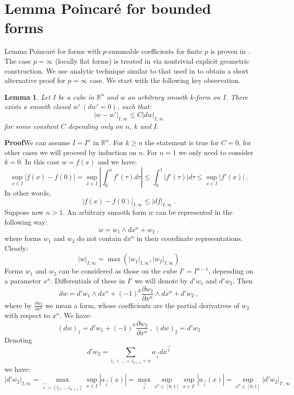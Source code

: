\documentclass{amsart}%
\newtheorem{lem}[thm]{Lemma}
\begin{document}
\section{Lemma Poincar\'e for bounded forms}
Lemma Poincar\'e for forms with $p$-summable coefficients for
finite $p$ is proven in \cite[Lemma 3.4]{GKS}. The case $p=\infty$
(locally flat forms) is treated in \cite{W} via nontrivial
explicit geometric construction. We use analytic technique similar
to that used in \cite{GKS} to obtain a short alternative proof for
$p=\infty$ case. We start with the following key observation.
\begin{lem}
\label{lem:3.2} Let $I$ be a cube in $\mathbb{R}^{n}$ and $w$ an
arbitrary smooth $k$-form on $I$. There exists a smooth closed
$w'\ (dw'=0)$, such that:
$$|w-w'|_{I,\infty}\leq
C|dw|_{I,\infty}$$ for some constant $C$ depending only on $n$,
$k$ and $I$.
\end{lem}
{\bf Proof}\quad We can assume $I=I^{n}$ in $\mathbb{R}^{n}$. For
$k\geq n$ the statement is true for $C=0$, for other cases we will
proceed by induction on $n$. For $n=1$ we only need to consider
$k=0$. In this case $w=f(x)$ and we have:
$$\sup_{x\in I}|f(x)-f(0)|=\sup_{x\in I}|\int_{0}^{x}f'(\tau)d\tau|\leq\int_{0}^{1}|f'(\tau)|d\tau\leq\sup_{x\in
I}|f'(x)|\ .$$ In other words, $$|f(x)-f(0)|_{I,\infty}\leq
|df|_{I,\infty}\ .$$ Suppose now $n>1$. An arbitrary smooth form
$w$ can be represented in the following way:
$$w=w_{1}\wedge dx^{n}+w_{2}\ ,$$
where forms $w_1$ and $w_2$ do not contain $dx^n$ in their
coordinate representations. Clearly:
\begin{equation}
\label{eq:9}
|w|_{I,\infty}=\max(|w_1|_{I,\infty},|w_2|_{I,\infty})
\end{equation}
Forms $w_1$ and $w_2$ can be considered as those on the cube
$I'=I^{n-1}$, depending on a parameter $x^n$. Differentials of
these in $I'$ we will denote by $d'w_1$ and $d'w_2$. Then
$$
dw=d'w_1\wedge dx^n + (-1)^k\frac{\partial w_2}{\partial
x^n}\wedge dx^n + d'w_2\ ,$$ where by $\frac{\partial
w_2}{\partial x^n}$ we mean a form, whose coefficients are the
partial derivatives of $w_2$ with respect to $x^n$. We have:
\begin{equation}
\label{eq:10} (dw)_1=d'w_1+(-1)^k\frac{\partial w_2}{\partial
x^n}\ ,\ (dw)_2=d'w_2
\end{equation}
Denoting $$d'w_2=\sum_{i_1<...<i_{k+1}<n}a_{\vec{i}}dx^{\vec{i}}$$
we have:
$$|d'w_2|_{I,\infty}=\max_{\vec{i}=(i_1,...,i_{k+1})}
\sup_{x \in I}|a_{\vec{i}}(x)|=\max_{\vec{i}}\sup_{x^n \in
[0,1]}\sup_{x \in I'}|a_{\vec{i}}(x)|=\sup_{x^n \in
[0,1]}|d'w_2|_{I',\infty}
$$
\end{document}
